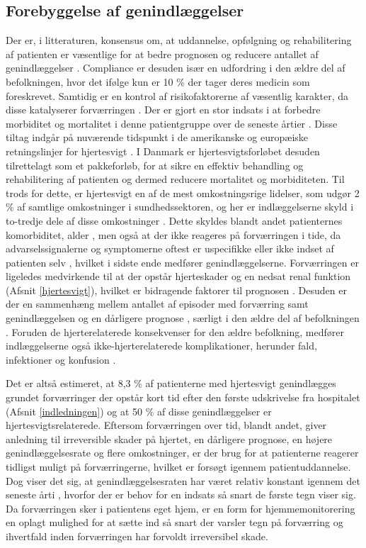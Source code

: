 \subsection{Forebyggelse af genindlæggelser}
Der er, i litteraturen, konsensus om, at uddannelse, opfølgning og rehabilitering af patienten er væsentlige for at bedre prognosen og reducere antallet af genindlæggelser \citep{kilde}. Compliance er desuden især en udfordring i den ældre del af befolkningen, hvor det ifølge \citet{Murray2009} kun er 10 \% der tager deres medicin som foreskrevet. Samtidig er en kontrol af risikofaktorerne af væsentlig karakter, da disse katalyserer forværringen \citep{sstpakke}. Der er gjort en stor indsats i at forbedre morbiditet og mortalitet i denne patientgruppe over de seneste årtier \citep{VBetihavas2013}. Disse tiltag indgår på nuværende tidspunkt i de amerikanske og europæiske retningslinjer for hjertesvigt \citep{Yancy2013}. I Danmark er hjertesvigtsforløbet desuden tilrettelagt som et pakkeforløb, for at sikre en effektiv behandling og rehabilitering af patienten \citep{sstpakke} og dermed reducere mortalitet og morbiditeten. Til trods for dette, er hjertesvigt en af de mest omkostningsrige lidelser, som udgør 2 \% af samtlige omkostninger i sundhedssektoren, og her er indlæggelserne skyld i to-tredje dele af disse omkostninger \citep{Shafie2018}. Dette skyldes blandt andet patienternes komorbiditet, alder \citep{JOyanguren2016}, men også at der ikke reageres på forværringen i tide, da advarselssignalerne og symptomerne oftest er uspecifikke eller ikke indset af patienten selv \citep{VConraads2011}, hvilket i sidste ende medfører genindlæggelserne. Forværringen er ligeledes medvirkende til at der opstår hjerteskader og en nedsat renal funktion (Afsnit \ref{hjertesvigt}), hvilket er bidragende faktorer til prognosen \citep{Gheorghiade2009}. Desuden er der en sammenhæng mellem antallet af episoder med forværring samt genindlæggelsen og en dårligere prognose \citep{JOyanguren2016}\citep{VConraads2011}\citep{VLueder2012}, særligt i den ældre del af befolkningen \citep{VLueder2012}.
Foruden de hjerterelaterede konsekvenser for den ældre befolkning, medfører indlæggelserne også ikke-hjerterelaterede komplikationer, herunder fald, infektioner og konfusion \citep{VBetihavas2013}.

Det er altså estimeret, at 8,3 \% af patienterne med hjertesvigt genindlægges grundet forværringer der opstår 
kort tid efter den første udskrivelse fra hospitalet (Afsnit \ref{indledningen}) og at 50 \% af disse genindlæggelser er hjertesvigtsrelaterede. Eftersom forværringen over tid, blandt andet, giver anledning til irreversible skader på hjertet, en dårligere prognose, en højere genindlæggelsesrate og flere omkostninger, er der brug for at patienterne reagerer tidligst muligt på forværringerne, hvilket er forsøgt igennem patientuddannelse. Dog viser det sig, at genindlæggelsesraten har været relativ konstant igennem det seneste årti \citep{Inan2018}, hvorfor der er behov for en indsats så snart de første tegn viser sig. Da forværringen sker i patientens eget hjem, er en form for hjemmemonitorering en oplagt mulighed for at sætte ind så snart der varsler tegn på forværring og ihvertfald inden forværringen har forvoldt irreversibel skade.